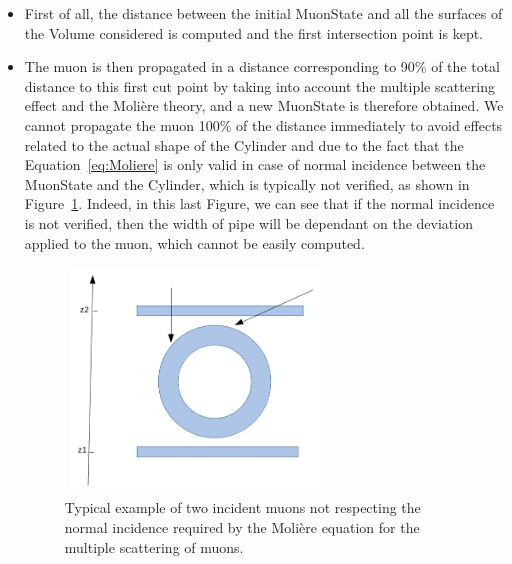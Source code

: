 \documentclass[a4paper, 11pt, twoside, openright]{report}
\begin{document}
\begin{itemize}
\item First of all, the distance between the initial MuonState and all the surfaces of the Volume considered is computed and the first intersection point is kept.
\item The muon is then propagated in a distance corresponding to 90\% of the total distance to this first cut point by taking into account the multiple scattering effect and the Moli\`ere theory, and a new MuonState is therefore obtained. We cannot propagate the muon 100\% of the distance immediately to avoid effects related to the actual shape of the Cylinder and due to the fact that the Equation~\ref{eq:Moliere} is only valid in case of normal incidence between the MuonState and the Cylinder, which is typically not verified, as shown in Figure~\ref{fig:normal}. Indeed, in this last Figure, we can see that if the normal incidence is not verified, then the width of pipe will be dependant on the deviation applied to the muon, which cannot be easily computed.

\begin{figure}[htbp]
\centering
\begin{minipage}[b]{.49\textwidth}
\includegraphics[width=7cm, height=6cm]{figs/normal.png}
\end{minipage}\hfill
\caption{Typical example of two incident muons not respecting the normal incidence required by the Moli\`ere equation for the multiple scattering of muons.}
\label{fig:normal}
\end{figure}


\end{itemize}
\end{document}
